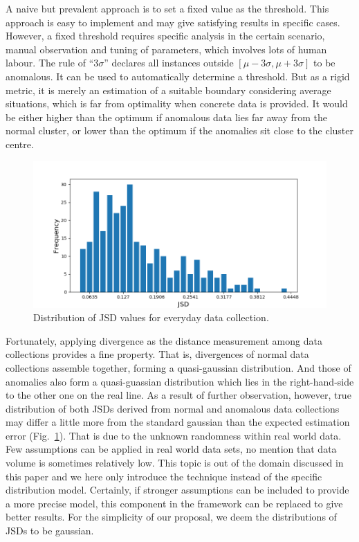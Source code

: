 \documentclass[10pt,conference,letterpaper]{IEEEtran}
\begin{document}
			A naive but prevalent approach is to set a fixed value as the threshold. This approach is easy to implement and may give satisfying results in specific cases. However, a fixed threshold requires specific analysis in the certain scenario, manual observation and tuning of parameters, which involves lots of human labour. The rule of ``$3 \sigma$'' declares all instances outside $[\mu - 3\sigma, \mu + 3\sigma]$ to be anomalous. It can be used to automatically determine a threshold. But as a rigid metric, it is merely an estimation of a suitable boundary considering average situations, which is far from optimality when concrete data is provided. It would be either higher than the optimum if anomalous data lies far away from the normal cluster, or lower than the optimum if the anomalies sit close to the cluster centre.
	
			\begin{figure}[!t]
				\centering
				\includegraphics[width=\linewidth]{fig/JSD-Dist.png}
				\caption{Distribution of JSD values for everyday data collection. }
				\label{fig:jsd-dist}
			\end{figure}
	
			Fortunately, applying divergence as the distance measurement among data collections provides a fine property. That is, divergences of normal data collections assemble together, forming a quasi-gaussian distribution. And those of anomalies also form a quasi-guassian distribution which lies in the right-hand-side to the other one on the real line. As a result of further observation, however, true distribution of both JSDs derived from normal and anomalous data collections may differ a little more from the standard gaussian than the expected estimation error (Fig.~\ref{fig:jsd-dist}). That is due to the unknown randomness within real world data. Few assumptions can be applied in real world data sets, no mention that data volume is sometimes relatively low. This topic is out of the domain discussed in this paper and we here only introduce the technique instead of the specific distribution model. 
			Certainly, if stronger assumptions can be included to provide a more precise model, this component in the framework can be replaced to give better results.
			For the simplicity of our proposal, we deem the distributions of JSDs to be gaussian.
	
\end{document}
